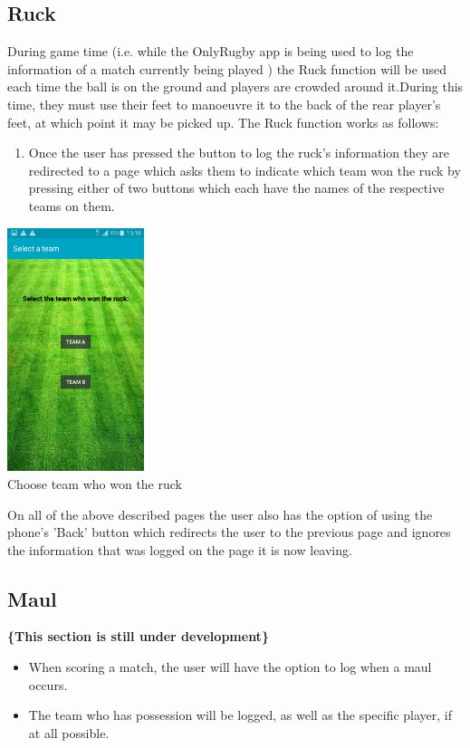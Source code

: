 \documentclass[hidelinks,a4paper,12pt]{article}
\begin{document}
	\subsection{Ruck}
		During game time (i.e. while the OnlyRugby app is being used to log the information of a match currently being played ) the Ruck function will be used each time the ball is on the ground and players are crowded around it.During this time, they must use their feet to manoeuvre it to the back of the rear player's feet, at which point it may be picked up. The Ruck function works as follows:
		\begin{enumerate}
			\item Once the user has pressed the button to log the ruck's information they are redirected to a page which asks them to indicate which
			team won the ruck by pressing either of two buttons which each have the names of the respective teams on them.
		\end{enumerate}
		\begin{center}
  			 \includegraphics[width=0.3\textwidth] {./images/choose_ruck_team.png}\\[0.4cm]
  			 \caption{Choose team who won the ruck}
		\end{center}
	On all of the above described pages the user also has the option of using the phone's  'Back' button which redirects the user to the previous page and ignores the information that was logged on the page it is now leaving.

	\subsection{Maul}
	{\bfseries\{This section is still under development\}}
		\begin{itemize}
			\item When scoring a match, the user will have the option to log when a maul occurs.
			\item The team who has possession will be logged, as well as the specific player, if at all possible.
		\end{itemize}
\end{document}
